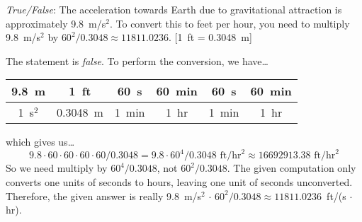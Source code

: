 \documentclass[11pt,letterpaper]{article}
\begin{document}
\quizsol \textit{True/False}: The acceleration towards Earth due to gravitational attraction is approximately 9.8~m/s$^2$. To convert this to feet per hour, you need to multiply 9.8~m/s$^2$ by $60^2/0.3048 \approx 11811.0236$. [1~ft = 0.3048~m] \pspace

\sol The statement is \textit{false}. To perform the conversion, we have\dots \par
	\begin{table}[!ht]
	\centering
	\hspace{-1cm}
	\begin{tabular}{c|c|c|c|c|c}
	9.8~m	& 1~ft		& 60~s   & 60~min & 60~s    & 60~min \\ \hline
	1~s$^2$	& 0.3048~m	& 1~min & 1~hr      & 1~min &  1~hr
	\end{tabular}
	\end{table} \par
which gives us\dots
	\[
	9.8 \cdot 60 \cdot 60 \cdot 60 \cdot 60/0.3048= 9.8 \cdot 60^4/0.3048 \text{ ft}/\text{hr}^2 \approx 16692913.38 \text{ ft}/\text{hr}^2
	\]
So we need multiply by $60^4/0.3048$, not $60^2/0.3048$. The given computation only converts one units of seconds to hours, leaving one unit of seconds unconverted. Therefore, the given answer is really 9.8~m/s$^2$ $\cdot$ $60^2/0.3048 \approx 11811.0236$~ft/(s $\cdot$ hr). 


\end{document}
